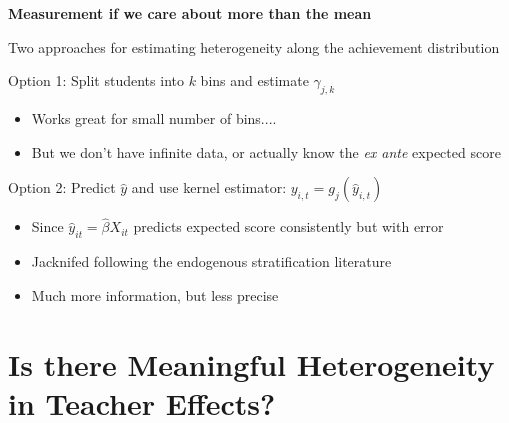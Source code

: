 \documentclass[t,aspectratio=169,11pt,presentation]{beamer}
\newenvironment{wideitemize}{\itemize\addtolength{\itemsep}{14pt}}{\enditemize}
\begin{document}
\begin{frame}{\textbf{Measurement if we care about more than the mean}}

\begin{wideitemize}
    \item Two approaches for estimating heterogeneity along the achievement distribution
    
    \item<2-> Option 1: Split students into $k$ bins and estimate $\gamma_{j,k}$ 
    \begin{itemize}
        \item Works great for small number of bins....
        \item But we don't have infinite data, or actually know the \textit{ex ante} expected score
    \end{itemize}

    \item<3-> Option 2: Predict $\hat{y}$ and use kernel estimator:  $y_{i,t}=g_j(\hat{y}_{i,t})$
    \begin{itemize}
        \item Since $\hat{y}_{it} = \hat{\beta} X_{it}$  predicts expected score consistently but with error
        \item Jacknifed following the endogenous stratification literature \citep{abadie2018endogenous}
        \item Much more information, but less precise
    \end{itemize}

\end{wideitemize}

\end{frame}


\section{Is there Meaningful Heterogeneity in Teacher Effects?}

\end{document}
